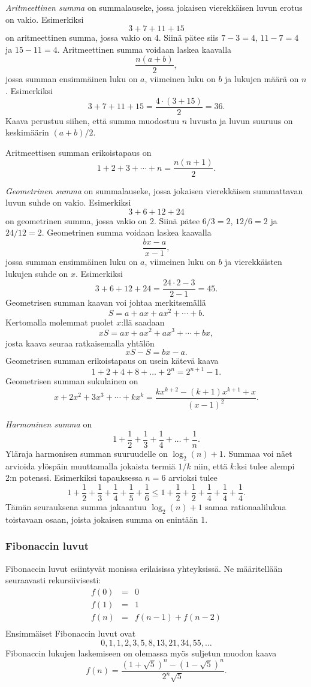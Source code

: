 \begin{samepage}
\textit{Aritmeettinen summa} on summalauseke,
jossa jokaisen vierekkäisen luvun erotus on vakio.
Esimerkiksi
\[3+7+11+15\]
on aritmeettinen summa,
jossa vakio on 4.
Siinä pätee siis $7-3=4$, $11-7=4$ ja $15-11=4$.
Aritmeettinen summa voidaan laskea kaavalla
\[\frac{n(a+b)}{2},\]
jossa summan ensimmäinen luku on $a$,
viimeinen luku on $b$ ja lukujen määrä on $n$.
Esimerkiksi
\[3+7+11+15=\frac{4 \cdot (3+15)}{2} = 36.\]
Kaava perustuu siihen, että summa muodostuu $n$ luvusta
ja luvun suuruus on keskimäärin $(a+b)/2$.
\end{samepage}
Aritmeettisen summan erikoistapaus on
\[1+2+3+\cdots+n = \frac{n(n+1)}{2}.\]

\noindent
\textit{Geometrinen summa} on summalauseke,
jossa jokaisen vierekkäisen
summattavan luvun suhde on vakio.
Esimerkiksi
\[3+6+12+24\]
on geometrinen summa,
jossa vakio on 2.
Siinä pätee $6/3=2$, $12/6=2$ ja $24/12=2$.
Geometrinen summa voidaan laskea kaavalla
\[\frac{bx-a}{x-1},\]
jossa summan ensimmäinen luku on $a$,
viimeinen luku on $b$ ja vierekkäisten lukujen suhde on $x$.
Esimerkiksi
\[3+6+12+24=\frac{24 \cdot 2 - 3}{2-1} = 45.\]
Geometrisen summan kaavan voi johtaa merkitsemällä
\[ S = a + ax + ax^2 + \cdots + b .\] 
Kertomalla molemmat puolet $x$:llä saadaan
\[ xS = ax + ax^2 + ax^3 + \cdots + bx,\]
josta kaava seuraa ratkaisemalla yhtälön
\[ xS-S = bx-a.\]
Geometrisen summan erikoistapaus on usein kätevä kaava
\[1+2+4+8+\ldots+2^n=2^{n+1}-1.\]
Geometrisen summan sukulainen on
\[x+2x^2+3x^3+\cdots+k x^k = \frac{kx^{k+2}-(k+1)x^{k+1}+x}{(x-1)^2}. \]

\noindent
\textit{Harmoninen summa} on
\[ 1+\frac{1}{2}+\frac{1}{3}+\frac{1}{4}+\ldots+\frac{1}{n}.\]
Yläraja harmonisen summan suuruudelle on $\log_2(n)+1$.
Summaa voi näet arvioida ylöspäin
muuttamalla jokaista termiä $1/k$ niin,
että $k$:ksi tulee alempi 2:n potenssi.
Esimerkiksi tapauksessa $n=6$ arvioksi tulee
\[ 1+\frac{1}{2}+\frac{1}{3}+\frac{1}{4}+\frac{1}{5}+\frac{1}{6} \le
1+\frac{1}{2}+\frac{1}{2}+\frac{1}{4}+\frac{1}{4}+\frac{1}{4}.\]
Tämän seurauksena summa jakaantuu $\log_2(n)+1$ samaa
rationaalilukua toistavaan osaan, joista jokaisen summa on enintään 1.

\subsubsection{Fibonaccin luvut}

Fibonaccin luvut esiintyvät monissa erilaisissa yhteyksissä.
Ne määritellään seuraavasti rekursiivisesti:
\[
\begin{array}{lcl}
f(0) & = & 0 \\
f(1) & = & 1 \\
f(n) & = & f(n-1)+f(n-2) \\
\end{array}
\]
Ensimmäiset Fibonaccin luvut ovat
\[0, 1, 1, 2, 3, 5, 8, 13, 21, 34, 55, \ldots\]
Fibonaccin lukujen laskemiseen on olemassa myös
suljetun muodon kaava
\[f(n)=\frac{(1 + \sqrt{5})^n - (1-\sqrt{5})^n}{2^n \sqrt{5}}.\]